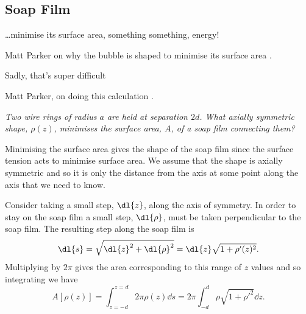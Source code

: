 \documentclass[fleqn]{NotesClass}
\begin{document}
    \subsection{Soap Film}
    \epigraph{\ldots minimise its surface area, something something, energy!}{Matt Parker on why the bubble is shaped to minimise its surface area \cite{parker2021}.}
    \epigraph{Sadly, that's super difficult}{Matt Parker, on doing this calculation \cite{parker2021}.}
    \textit{Two wire rings of radius \(a\) are held at separation \(2d\). What axially symmetric shape, \(\rho(z)\), minimises the surface area, \(A\), of a soap film connecting them?}
    
    \begin{rmk}
        Minimising the surface area gives the shape of the soap film since the surface tension acts to minimise surface area. We assume that the shape is axially symmetric and so it is only the distance from the axis at some point along the axis that we need to know.
    \end{rmk}
    
    Consider taking a small step, \(\dl{z}\), along the axis of symmetry.
    In order to stay on the soap film a small step, \(\dl{\rho}\), must be taken perpendicular to the soap film.
    The resulting step along the soap film is
    \begin{equation}
        \dl{s} = \sqrt{\dl{z}^2 + \dl{\rho}^2} = \dl{z} \sqrt{1 + \rho'(z)^2}.
    \end{equation}
    Multiplying by \(2\pi\) gives the area corresponding to this range of \(z\) values and so integrating we have
    \begin{equation}
        A[\rho(z)] = \int_{z=-d}^{z=d} 2\pi \rho(z) \dd{s} = 2\pi \int_{-d}^{d} \rho\sqrt{1 + \rho'^2} \dd{z}.
    \end{equation}
\end{document}
